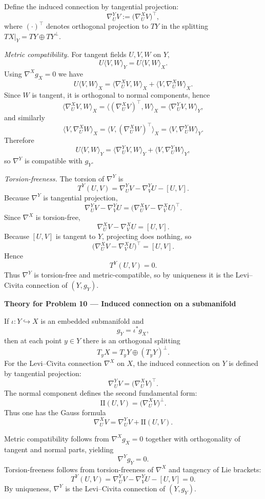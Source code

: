 \begin{solution}
Define the induced connection by tangential projection:
\[
\nabla^Y_U V := \bigl(\nabla^X_U V\bigr)^{\top},
\]
where $(\cdot)^\top$ denotes orthogonal projection to $TY$ in the splitting $TX|_Y=TY\oplus TY^\perp$.

\textit{Metric compatibility.}
For tangent fields $U,V,W$ on $Y$,
\[
U\langle V,W\rangle_Y
=
U\langle V,W\rangle_X.
\]
Using $\nabla^X g_X=0$ we have
\[
U\langle V,W\rangle_X
=
\langle \nabla^X_U V, W\rangle_X
+
\langle V,\nabla^X_U W\rangle_X.
\]
Since $W$ is tangent, it is orthogonal to normal components, hence
\[
\langle \nabla^X_U V, W\rangle_X
=
\langle (\nabla^X_U V)^\top, W\rangle_X
=
\langle \nabla^Y_U V, W\rangle_Y,
\]
and similarly
\[
\langle V,\nabla^X_U W\rangle_X
=
\langle V,(\nabla^X_U W)^\top\rangle_X
=
\langle V,\nabla^Y_U W\rangle_Y.
\]
Therefore
\[
U\langle V,W\rangle_Y
=
\langle \nabla^Y_U V, W\rangle_Y
+
\langle V,\nabla^Y_U W\rangle_Y,
\]
so $\nabla^Y$ is compatible with $g_Y$.

\textit{Torsion-freeness.}
The torsion of $\nabla^Y$ is
\[
T^Y(U,V)=\nabla^Y_U V-\nabla^Y_V U-[U,V].
\]
Because $\nabla^Y$ is tangential projection,
\[
\nabla^Y_U V-\nabla^Y_V U
=
\bigl(\nabla^X_U V-\nabla^X_V U\bigr)^\top.
\]
Since $\nabla^X$ is torsion-free,
\[
\nabla^X_U V-\nabla^X_V U=[U,V].
\]
Because $[U,V]$ is tangent to $Y$, projecting does nothing, so
\[
\bigl(\nabla^X_U V-\nabla^X_V U\bigr)^\top
=
[U,V].
\]
Hence
\[
T^Y(U,V)=0.
\]
Thus $\nabla^Y$ is torsion-free and metric-compatible, so by uniqueness it is the Levi--Civita connection of $(Y,g_Y)$.




\par\medskip\noindent\textbf{Theory for Problem 10 --- Induced connection on a submanifold}\par\smallskip


If $\iota:Y\hookrightarrow X$ is an embedded submanifold and
\[
g_Y=\iota^*g_X,
\]
then at each point $y\in Y$ there is an orthogonal splitting
\[
T_yX=T_yY\oplus (T_yY)^\perp.
\]
For the Levi--Civita connection $\nabla^X$ on $X$, the induced connection on $Y$ is defined by tangential projection:
\[
\nabla^Y_U V=\bigl(\nabla^X_U V\bigr)^\top.
\]
The normal component defines the second fundamental form:
\[
\mathrm{II}(U,V)=\bigl(\nabla^X_U V\bigr)^\perp.
\]
Thus one has the Gauss formula
\[
\nabla^X_U V=\nabla^Y_U V+\mathrm{II}(U,V).
\]

Metric compatibility follows from $\nabla^X g_X=0$ together with orthogonality of tangent and normal parts, yielding
\[
\nabla^Y g_Y=0.
\]
Torsion-freeness follows from torsion-freeness of $\nabla^X$ and tangency of Lie brackets:
\[
T^Y(U,V)=\nabla^Y_U V-\nabla^Y_V U-[U,V]=0.
\]
By uniqueness, $\nabla^Y$ is the Levi--Civita connection of $(Y,g_Y)$.



\end{solution}
